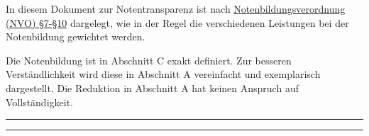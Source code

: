 \documentclass{article}
\newcommand{\versiondir}{_version}
\newcommand{\nvourl}{https://www.landesrecht-bw.de/bsbw/document/jlr-NotBildVBWrahmen}
\begin{document}
	\vspace*{-1cm}
	In diesem Dokument zur Notentransparenz ist nach \href{\nvourl}{Notenbildungsverordnung (NVO) §7-§10} \cite{nvo} dargelegt, wie in der Regel die verschiedenen Leistungen bei der Notenbildung gewichtet werden.

	Die Notenbildung ist in Abschnitt C exakt definiert. Zur besseren Verständlichkeit wird diese in Abschnitt A vereinfacht und exemplarisch dargestellt. Die Reduktion in Abschnitt A hat keinen Anspruch auf Vollständigkeit.

		
	\rule{\linewidth}{2pt}
	\renewcommand{\contentsname}{Abschnitte der Notentransparenz}
	\tableofcontents
	\rule{\linewidth}{2pt}
	
	
	
	\vspace{0.2cm}

	

	\clearpage
	
\end{document}
